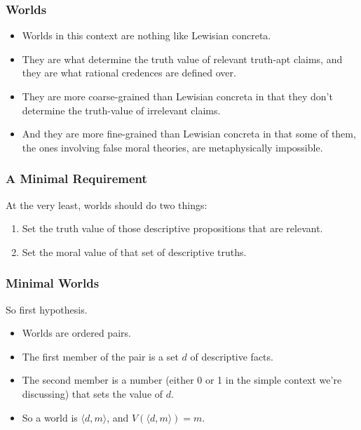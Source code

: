 \begin{frame}[fragile]
\frametitle{Worlds}
\label{worlds}

\begin{itemize}
\item{} Worlds in this context are nothing like Lewisian concreta.

\item{} They are what determine the truth value of relevant truth-apt claims, and they are what rational credences are defined over.

\item{} They are more coarse-grained than Lewisian concreta in that they don't determine the truth-value of irrelevant claims.

\item{} And they are more fine-grained than Lewisian concreta in that some of them, the ones involving false moral theories, are metaphysically impossible.

\end{itemize}

\end{frame}

\begin{frame}[fragile]
\frametitle{A Minimal Requirement}
\label{aminimalrequirement}

At the very least, worlds should do two things:

\begin{enumerate}
\item{} Set the truth value of those descriptive propositions that are relevant.

\item{} Set the moral value of that set of descriptive truths.

\end{enumerate}

\end{frame}

\begin{frame}[fragile]
\frametitle{Minimal Worlds}
\label{minimalworlds}

So first hypothesis.

\begin{itemize}
\item{} Worlds are ordered pairs.

\item{} The first member of the pair is a set $d$ of descriptive facts.

\item{} The second member is a number (either 0 or 1 in the simple context we're discussing) that sets the value of $d$.

\item{} So a world is $\langle d, m \rangle$, and $V(\langle d, m \rangle) = m$.

\end{itemize}

\end{frame}

